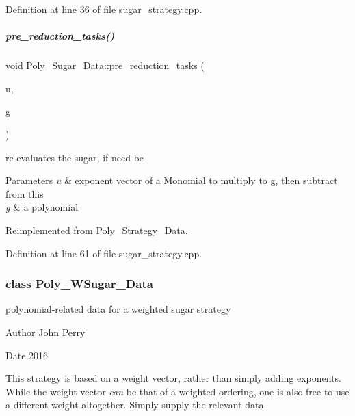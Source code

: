 Definition at line 36 of file sugar\+\_\+strategy.\+cpp.

\mbox{\label{group__strategygroup_a1b2e8a7fe4fcd57555fa58e48620b2bf}} 
\subparagraph{\texorpdfstring{pre\+\_\+reduction\+\_\+tasks()}{pre\_reduction\_tasks()}}
{\footnotesize\ttfamily void Poly\+\_\+\+Sugar\+\_\+\+Data\+::pre\+\_\+reduction\+\_\+tasks (\begin{DoxyParamCaption}\item[{const E\+X\+P\+\_\+\+T\+Y\+PE $\ast$}]{u,  }\item[{const \hyperlink{group__polygroup_class_abstract___polynomial}{Abstract\+\_\+\+Polynomial} \&}]{g }\end{DoxyParamCaption})\hspace{0.3cm}{\ttfamily [virtual]}}



re-\/evaluates the sugar, if need be 


\begin{DoxyParams}{Parameters}
{\em u} & exponent vector of a \hyperlink{group__polygroup_class_monomial}{Monomial} to multiply to {\ttfamily g}, then subtract from {\ttfamily this} \\
\hline
{\em g} & a polynomial \\
\hline
\end{DoxyParams}


Reimplemented from \hyperlink{group__strategygroup_a0d71db50c58a24f48f94eae6a48c2149}{Poly\+\_\+\+Strategy\+\_\+\+Data}.



Definition at line 61 of file sugar\+\_\+strategy.\+cpp.

\label{class_poly___w_sugar___data}
\subsubsection{class Poly\+\_\+\+W\+Sugar\+\_\+\+Data}
polynomial-\/related data for a weighted sugar strategy 

\begin{DoxyAuthor}{Author}
John Perry 
\end{DoxyAuthor}
\begin{DoxyDate}{Date}
2016
\end{DoxyDate}
This strategy is based on a weight vector, rather than simply adding exponents. While the weight vector {\itshape can} be that of a weighted ordering, one is also free to use a different weight altogether. Simply supply the relevant data. 

